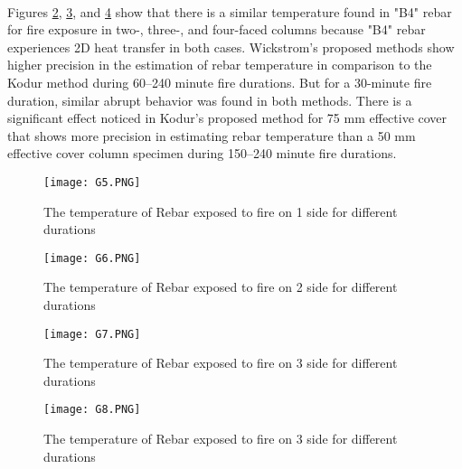 \documentclass[12pt, letterpaper, oneside]{report}
\begin{document}
\\
Figures \ref{fig:8}, \ref{fig:9}, and \ref{fig:10} show that there is a similar temperature found in "B4" rebar for fire exposure in two-, three-, and four-faced columns because "B4" rebar experiences 2D heat transfer in both cases. Wickstrom's proposed methods show higher precision in the estimation of rebar temperature in comparison to the Kodur method during 60–240 minute fire durations. But for a 30-minute fire duration, similar abrupt behavior was found in both methods. There is a significant effect noticed in Kodur's proposed method for 75 mm effective cover that shows more precision in estimating rebar temperature than a 50 mm effective cover column specimen during 150–240 minute fire durations.
\begin{figure}
    \centering
    \texttt{[image: G5.PNG]}
    \caption{The temperature of Rebar exposed to fire on 1 side for different durations}
    \label{fig:7}
\end{figure}
\begin{figure}
    \centering
    \texttt{[image: G6.PNG]}
    \caption{The temperature of Rebar exposed to fire on 2 side for different durations}
    \label{fig:8}
\end{figure}
\begin{figure}
    \centering
    \texttt{[image: G7.PNG]}
    \caption{The temperature of Rebar exposed to fire on 3 side for different durations}
    \label{fig:9}
\end{figure}
\begin{figure}
    \centering
    \texttt{[image: G8.PNG]}
    \caption{The temperature of Rebar exposed to fire on 3 side for different durations}
    \label{fig:10}
\end{figure}
\end{document}
